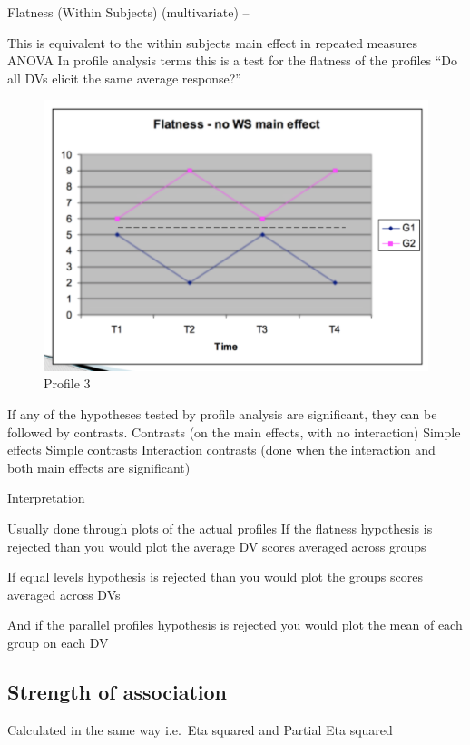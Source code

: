 \documentclass[]{book}
\theoremstyle{definition}
\theoremstyle{definition}
\theoremstyle{definition}
\theoremstyle{remark}
\begin{document}
Flatness (Within Subjects) (multivariate) --

This is equivalent to the within subjects main effect in repeated
measures ANOVA In profile analysis terms this is a test for the flatness
of the profiles ``Do all DVs elicit the same average response?''

\begin{figure}
\centering
\includegraphics{img/jhprofile4.png}
\caption{Profile 3}
\end{figure}

If any of the hypotheses tested by profile analysis are significant,
they can be followed by contrasts. Contrasts (on the main effects, with
no interaction) Simple effects Simple contrasts Interaction contrasts
(done when the interaction and both main effects are significant)

Interpretation

Usually done through plots of the actual profiles If the flatness
hypothesis is rejected than you would plot the average DV scores
averaged across groups

If equal levels hypothesis is rejected than you would plot the groups
scores averaged across DVs

And if the parallel profiles hypothesis is rejected you would plot the
mean of each group on each DV

\subsection{Strength of association}\label{strength-of-association}

Calculated in the same way i.e.~Eta squared and Partial Eta squared
\end{document}

